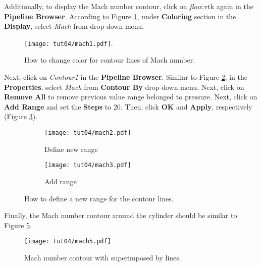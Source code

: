 Additionally, to display the Mach number contour, click on \textit{flow}.vtk again in the \textbf{Pipeline Browser}. According to Figure \ref{fig4:mach1_4}, under \textbf{Coloring} section in the \textbf{Display}, select \textit{Mach} from drop-down menu.
\begin{figure}[htbp]
    \centering
    \texttt{[image: tut04/mach1.pdf]}.
    \caption{How to change color for contour lines of Mach number.}
    \label{fig4:mach1_4}
\end{figure}
Next, click on \textit{Contour1} in the \textbf{Pipeline Browser}. Similar to Figure \ref{fig4:mach2_4 a}, in the \textbf{Properties}, select \textit{Mach} from \textbf{Contour By} drop-down menu. Next, click on \textbf{Remove All} to remove previous value range belonged to pressure. Next, click on \textbf{Add Range} and set the \textbf{Steps} to 20. Then, click \textbf{OK} and \textbf{Apply}, respectively (Figure \ref{fig4:mach2_4 b}).
\begin{figure}[htbp]
    \centering
    \begin{subfigure}[b]{0.4\textwidth}
        \centering
        \texttt{[image: tut04/mach2.pdf]}
        \caption{Define new range}
        \label{fig4:mach2_4 a}
    \end{subfigure}
    \hfill
    \begin{subfigure}[b]{.4\textwidth}
        \centering
        \texttt{[image: tut04/mach3.pdf]}
        \caption{Add range}
        \label{fig4:mach2_4 b}
    \end{subfigure}     
    \caption{How to define a new range for the contour lines.}
    \label{fig4:mach2_4}
\end{figure}
Finally, the Mach number contour around the cylinder should be similar to Figure \ref{fig4:mach5_4}.
\begin{figure}[htbp]
    \centering
    \texttt{[image: tut04/mach5.pdf]}
    \caption{Mach number contour with superimposed by lines.}
    \label{fig4:mach5_4}
\end{figure}
